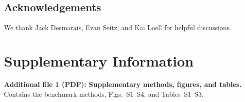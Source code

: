 \documentclass[pdflatex,sn-vancouver-num,referee,oneside]{sn-jnl}
\begin{document}
\subsection*{Acknowledgements}
We thank Jack Desmarais, Evan Seitz, and Kai Loell for helpful discussions.

\section*{Supplementary Information}

\textbf{Additional file 1 (PDF): Supplementary methods, figures, and tables.}
Contains the benchmark methods, Figs.~S1--S4, and Tables~S1--S3.


\end{document}
